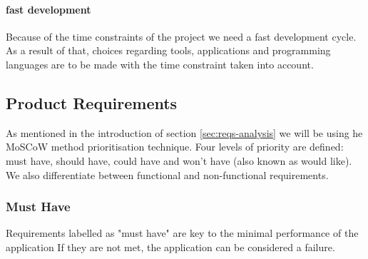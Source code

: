 \paragraph{fast development} Because of the time constraints of the project we need a fast development cycle. As a result of that, choices regarding tools, applications and programming languages are to be made with the time constraint taken into account.


\subsection{Product Requirements}\label{sec:reqs}
As mentioned in the introduction of section \ref{sec:reqs-analysis} we will be using he MoSCoW method prioritisation technique. Four levels of priority are defined: must have, should have, could have and won't have (also known as would like). We also differentiate between functional and non-functional requirements. 

\subsubsection {Must Have}
Requirements labelled as "must have" are key to the minimal performance of the application If they are not met, the application can be considered a failure.

